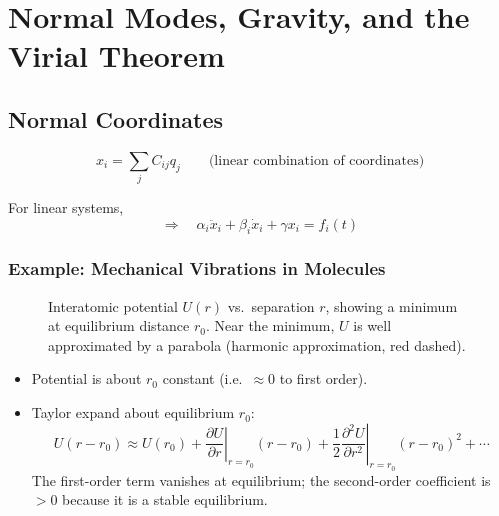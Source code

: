
\chapter{Normal Modes, Gravity, and the Virial Theorem}

\section{Normal Coordinates}

\[
    x_i = \sum_j C_{ij} q_j \qquad \text{(linear combination of coordinates)}
\]

For linear systems,
\[
    \Rightarrow\quad \alpha_i \ddot{x}_i + \beta_i \dot{x}_i + \gamma x_i = f_i(t)
\]

\subsection{Example: Mechanical Vibrations in Molecules}

\begin{figure}[H]
\begin{center}
\end{center}
\caption{Interatomic potential $U(r)$ vs.\ separation $r$, showing a minimum at equilibrium distance $r_0$. Near the minimum, $U$ is well approximated by a parabola (harmonic approximation, red dashed).}
\label{fig:interatomic_pot}
\end{figure}

\begin{itemize}
    \item Potential is about $r_0$ constant (i.e.\ $\approx 0$ to first order).
    \item Taylor expand about equilibrium $r_0$:
    \[
        U(r - r_0) \approx U(r_0) + \left.\frac{\partial U}{\partial r}\right|_{r=r_0}(r - r_0)
        + \frac{1}{2}\left.\frac{\partial^2 U}{\partial r^2}\right|_{r=r_0}(r-r_0)^2 + \cdots
    \]
    The first-order term vanishes at equilibrium; the second-order coefficient is $> 0$ because it is a stable equilibrium.
\end{itemize}

